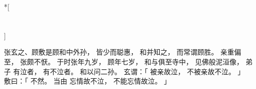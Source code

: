 
\switchcolumn[0]*[\section{}]

张玄之、顾敷是顾和中外孙，
皆少而聪惠，
和并知之，
而常谓顾胜。
亲重偏至，
张颇不恹。
于时张年九岁，
顾年七岁，
和与俱至寺中，
见佛般泥洹像，
弟子
  有泣者，
有不泣者。
和以问二孙。
玄谓：「
      被亲故泣，
    不被亲故不泣。
」
敷曰：「
    不然。
    当由
        忘情故不泣，
    不能忘情故泣。
」

\switchcolumn


